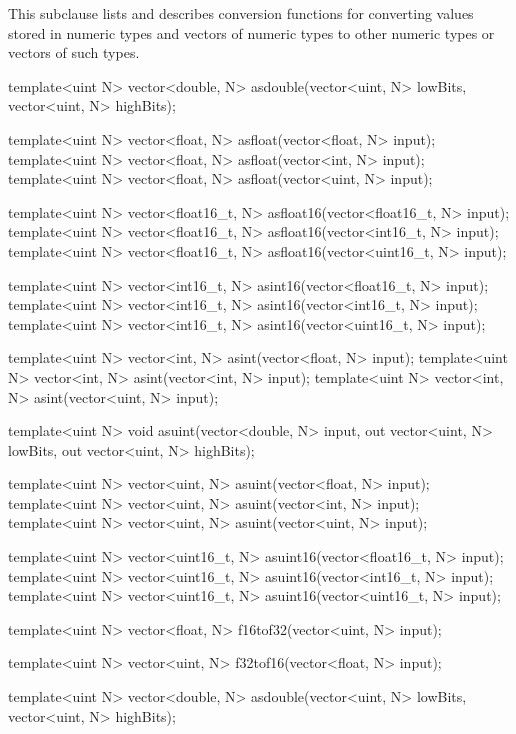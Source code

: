 
\p This subclause lists and describes conversion functions for converting values
stored in numeric types and vectors of numeric types to other numeric types or
vectors of such types.

\begin{HLSL}
template<uint N> vector<double, N> asdouble(vector<uint, N> lowBits, vector<uint, N> highBits);

template<uint N> vector<float, N> asfloat(vector<float, N> input);
template<uint N> vector<float, N> asfloat(vector<int, N> input);
template<uint N> vector<float, N> asfloat(vector<uint, N> input);

template<uint N> vector<float16\_t, N> asfloat16(vector<float16\_t, N> input);
template<uint N> vector<float16\_t, N> asfloat16(vector<int16\_t, N> input);
template<uint N> vector<float16\_t, N> asfloat16(vector<uint16\_t, N> input);

template<uint N> vector<int16\_t, N> asint16(vector<float16\_t, N> input);
template<uint N> vector<int16\_t, N> asint16(vector<int16\_t, N> input);
template<uint N> vector<int16\_t, N> asint16(vector<uint16\_t, N> input);

template<uint N> vector<int, N> asint(vector<float, N> input);
template<uint N> vector<int, N> asint(vector<int, N> input);
template<uint N> vector<int, N> asint(vector<uint, N> input);

template<uint N> void asuint(vector<double, N> input, out vector<uint, N> lowBits, out vector<uint, N> highBits);

template<uint N> vector<uint, N> asuint(vector<float, N> input);
template<uint N> vector<uint, N> asuint(vector<int, N> input);
template<uint N> vector<uint, N> asuint(vector<uint, N> input);

template<uint N> vector<uint16\_t, N> asuint16(vector<float16\_t, N> input);
template<uint N> vector<uint16\_t, N> asuint16(vector<int16\_t, N> input);
template<uint N> vector<uint16\_t, N> asuint16(vector<uint16\_t, N> input);

template<uint N> vector<float, N> f16tof32(vector<uint, N> input);

template<uint N> vector<uint, N> f32tof16(vector<float, N> input);
\end{HLSL}


\begin{HLSL}
template<uint N> vector<double, N> asdouble(vector<uint, N> lowBits, vector<uint, N> highBits);
\end{HLSL}

